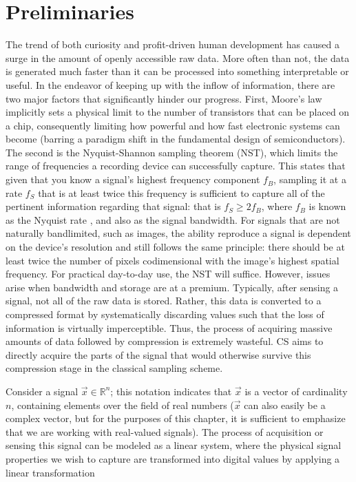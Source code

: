 \chapter{Preliminaries}
\label{chap:theory}

The trend of both curiosity and profit-driven human development has caused a
surge in the amount of openly accessible raw data. More often than not, the data is generated much faster than it can be processed into something interpretable or useful. In the endeavor of keeping up with the inflow of information, there are two major factors that significantly hinder our progress. First, Moore’s law implicitly sets a physical limit to the number of transistors that can be placed on a chip, consequently limiting how powerful and how fast electronic systems can become (barring a paradigm shift in the fundamental design of semiconductors). The second is the Nyquist-Shannon sampling theorem (NST), which limits the range of frequencies a recording device can successfully capture. This states that given that you know a signal's highest frequency component $f_B$, sampling it at a rate $f_S$ that is at least twice this frequency is sufficient to capture all of the pertinent information regarding that signal: that is $f_S \geq 2f_B$, where $f_B$ is known as the Nyquist rate \cite{Shannon1949}, and also as the signal bandwidth. For signals that are not naturally bandlimited, such as images, the ability reproduce a signal is dependent on the device's resolution and still follows the same principle: there should be at least twice the number of pixels codimensional with the image's highest spatial frequency. For practical day-to-day use, the NST will suffice. However, issues arise when bandwidth and storage are at a premium. Typically, after sensing a signal, not all of the raw data is stored. Rather, this data is converted to a compressed format by systematically discarding values such that the loss of information is virtually imperceptible. Thus, the process of acquiring massive amounts of data followed by compression is extremely wasteful. CS aims to directly acquire the parts of the signal that would otherwise survive this compression stage in the classical sampling scheme.

Consider a signal $\vec{x} \in \mathbb{R}^{n}$; this notation indicates that $\vec{x}$ is a vector of cardinality $n$, containing elements over the field of real numbers ($\vec{x}$ can also easily be a complex vector, but for the purposes of this chapter, it is sufficient to emphasize that we are working with real-valued signals). The process of acquisition or sensing this signal can be modeled as a linear system, where the physical signal properties we wish to capture are transformed into digital values by applying a linear transformation

